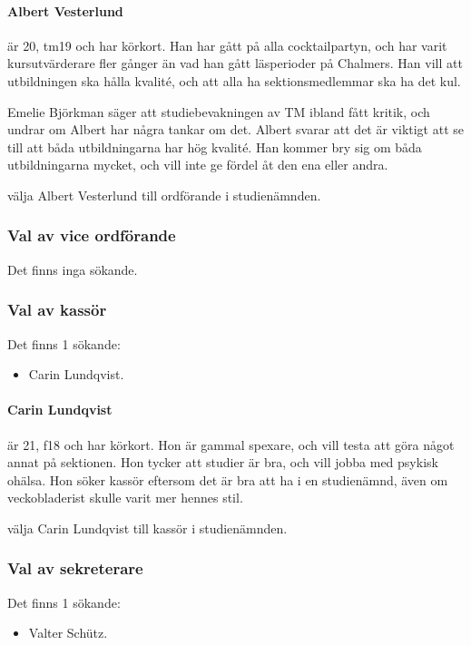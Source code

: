 \documentclass[hidelinks]{sektionsmote}
\begin{document}
\paragraph{Albert Vesterlund} är 20, tm19 och har körkort.
Han har gått på alla cocktailpartyn, och har varit kursutvärderare fler gånger än vad han gått läsperioder på Chalmers.
Han vill att utbildningen ska hålla kvalité, och att alla ha sektionsmedlemmar ska ha det kul.

Emelie Björkman säger att studiebevakningen av TM ibland fått kritik, och undrar om Albert har några tankar om det.
Albert svarar att det är viktigt att se till att båda utbildningarna har hög kvalité.
Han kommer bry sig om båda utbildningarna mycket, och vill inte ge fördel åt den ena eller andra.

\begin{beslut}
  \item välja Albert Vesterlund till ordförande i studienämnden.
\end{beslut}

\subsubsection{Val av vice ordförande}
Det finns inga sökande.

\subsubsection{Val av kassör}
Det finns 1 sökande:
\begin{itemize}
    \item Carin Lundqvist.
\end{itemize}

\paragraph{Carin Lundqvist} är 21, f18 och har körkort.
Hon är gammal spexare, och vill testa att göra något annat på sektionen.
Hon tycker att studier är bra, och vill jobba med psykisk ohälsa.
Hon söker kassör eftersom det är bra att ha i en studienämnd, även om veckobladerist skulle varit mer hennes stil.

\begin{beslut}
  \item välja Carin Lundqvist till kassör i studienämnden.
\end{beslut}

\subsubsection{Val av sekreterare}
Det finns 1 sökande:
\begin{itemize}
    \item Valter Schütz.
\end{itemize}
\end{document}
